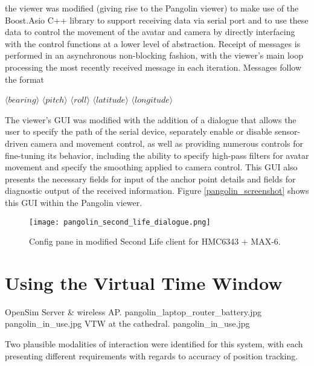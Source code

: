 the viewer was modified (giving rise to the Pangolin viewer) to make use of the Boost.Asio C++ library to support receiving data via serial port and to use these data to control the movement of the avatar and camera by directly interfacing with the control functions at a lower level of abstraction. Receipt of messages is performed in an asynchronous non-blocking fashion, with the viewer's main loop processing the most recently received message in each iteration. Messages follow the format

$\langle bearing \rangle$ $\langle pitch \rangle$ $\langle roll \rangle$ $\langle latitude \rangle$ $\langle longitude \rangle$

The viewer's GUI was modified with the addition of a dialogue that allows the user to specify the path of the serial device, separately enable or disable sensor-driven camera and movement control, as well as providing numerous controls for fine-tuning its behavior, including the ability to specify high-pass filters for avatar movement and specify the smoothing applied to camera control. This GUI also presents the necessary fields for input of the anchor point details and fields for diagnostic output of the received information. Figure \ref{pangolin_screenshot} shows this GUI within the Pangolin viewer.

\begin{figure}[h]
\centering
  \texttt{[image: pangolin\_second\_life\_dialogue.png]}
  \caption{Config pane in modified Second Life client for HMC6343 + MAX-6.}
  \label{pangolin_second_life_dialogue.png}
\end{figure}


\section{Using the Virtual Time Window}

 {OpenSim Server \& wireless AP.} {pangolin_laptop_router_battery.jpg}
       {pangolin_in_use.jpg} {VTW at the cathedral.} {pangolin_in_use.jpg}

Two plausible modalities of interaction were identified for this system, with each presenting different requirements with regards to accuracy of position tracking.

